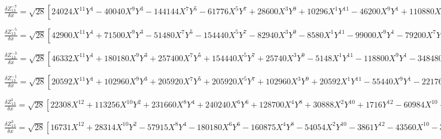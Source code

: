 \documentclass[10pt,landscape]{article}
\begin{document}
\vspace{1.2 mm}
\noindent $ \frac{\delta Z^{-7}_{13}}{\delta x} = \sqrt{28} [24024X^{11}Y^{1} -40040X^{9}Y^{3} -144144X^{7}Y^{5} -61776X^{5}Y^{7} +28600X^{3}Y^{9} +10296X^{1}Y^{11} -46200X^{9}Y^{1} +110880X^{7}Y^{3} +166320X^{5}Y^{5} -15840X^{3}Y^{7} -25080X^{1}Y^{9} +27720X^{7}Y^{1} -83160X^{5}Y^{3} -27720X^{3}Y^{5} +19800X^{1}Y^{7} -5040X^{5}Y^{1} +16800X^{3}Y^{3} -5040X^{1}Y^{5}] $

\vspace{1.2 mm}
\noindent $ \frac{\delta Z^{-5}_{13}}{\delta x} = \sqrt{28} [42900X^{11}Y^{1} +71500X^{9}Y^{3} -51480X^{7}Y^{5} -154440X^{5}Y^{7} -82940X^{3}Y^{9} -8580X^{1}Y^{11} -99000X^{9}Y^{1} -79200X^{7}Y^{3} +166320X^{5}Y^{5} +174240X^{3}Y^{7} +27720X^{1}Y^{9} +79200X^{7}Y^{1} -110880X^{3}Y^{5} -31680X^{1}Y^{7} -25200X^{5}Y^{1} +16800X^{3}Y^{3} +15120X^{1}Y^{5} +2520X^{3}Y^{1} -2520X^{1}Y^{3}] $

\vspace{1.2 mm}
\noindent $ \frac{\delta Z^{-3}_{13}}{\delta x} = \sqrt{28} [46332X^{11}Y^{1} +180180X^{9}Y^{3} +257400X^{7}Y^{5} +154440X^{5}Y^{7} +25740X^{3}Y^{9} -5148X^{1}Y^{11} -118800X^{9}Y^{1} -348480X^{7}Y^{3} -332640X^{5}Y^{5} -95040X^{3}Y^{7} +7920X^{1}Y^{9} +110880X^{7}Y^{1} +221760X^{5}Y^{3} +110880X^{3}Y^{5} -45360X^{5}Y^{1} -50400X^{3}Y^{3} -5040X^{1}Y^{5} +7560X^{3}Y^{1} +2520X^{1}Y^{3} -336X^{1}Y^{1}] $

\vspace{1.2 mm}
\noindent $ \frac{\delta Z^{-1}_{13}}{\delta x} = \sqrt{28} [20592X^{11}Y^{1} +102960X^{9}Y^{3} +205920X^{7}Y^{5} +205920X^{5}Y^{7} +102960X^{3}Y^{9} +20592X^{1}Y^{11} -55440X^{9}Y^{1} -221760X^{7}Y^{3} -332640X^{5}Y^{5} -221760X^{3}Y^{7} -55440X^{1}Y^{9} +55440X^{7}Y^{1} +166320X^{5}Y^{3} +166320X^{3}Y^{5} +55440X^{1}Y^{7} -25200X^{5}Y^{1} -50400X^{3}Y^{3} -25200X^{1}Y^{5} +5040X^{3}Y^{1} +5040X^{1}Y^{3} -336X^{1}Y^{1}] $

\vspace{1.2 mm}
\noindent $ \frac{\delta Z^{1}_{13}}{\delta x} = \sqrt{28} [22308X^{12} +113256X^{10}Y^{2} +231660X^{8}Y^{4} +240240X^{6}Y^{6} +128700X^{4}Y^{8} +30888X^{2}Y^{10} +1716Y^{12} -60984X^{10} -249480X^{8}Y^{2} -388080X^{6}Y^{4} -277200X^{4}Y^{6} -83160X^{2}Y^{8} -5544Y^{10} +62370X^{8} +194040X^{6}Y^{2} +207900X^{4}Y^{4} +83160X^{2}Y^{6} +6930Y^{8} -29400X^{6} -63000X^{4}Y^{2} -37800X^{2}Y^{4} -4200Y^{6} +6300X^{4} +7560X^{2}Y^{2} +1260Y^{4} -504X^{2} -168Y^{2} +7] $

\vspace{1.2 mm}
\noindent $ \frac{\delta Z^{3}_{13}}{\delta x} = \sqrt{28} [16731X^{12} +28314X^{10}Y^{2} -57915X^{8}Y^{4} -180180X^{6}Y^{6} -160875X^{4}Y^{8} -54054X^{2}Y^{10} -3861Y^{12} -43560X^{10} -35640X^{8}Y^{2} +166320X^{6}Y^{4} +277200X^{4}Y^{6} +130680X^{2}Y^{8} +11880Y^{10} +41580X^{8} -138600X^{4}Y^{4} -110880X^{2}Y^{6} -13860Y^{8} -17640X^{6} +12600X^{4}Y^{2} +37800X^{2}Y^{4} +7560Y^{6} +3150X^{4} -3780X^{2}Y^{2} -1890Y^{4} -168X^{2} +168Y^{2}] $
\end{document}
